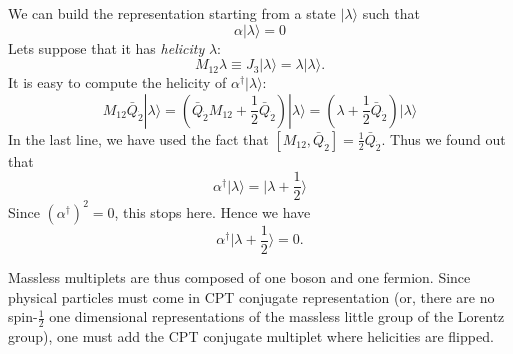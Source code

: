 We can build the representation starting from a state $|\lambda\rangle$ such
that
\begin{equation}
  \alpha|\lambda\rangle = 0
\end{equation}
Lets suppose that it has \textit{helicity} $\lambda$:
\begin{equation}
  M_{12}\lambda \equiv J_3|\lambda\rangle = \lambda|\lambda\rangle.
\end{equation}
It is easy to compute the helicity of $\alpha^{\dagger}|\lambda\rangle$:
\begin{equation}
  M_{12} \bar{Q}_{\dot{2}}|\lambda\rangle
  = \left(\bar{Q}_{\dot{2}}M_{12}+\frac{1}{2}\bar{Q}_{\dot{2}}\right)|\lambda\rangle
  = (\lambda+\frac{1}{2}\bar{Q}_{\dot{2}})|\lambda\rangle 
\end{equation}
In the last line, we have used the fact that
$\left[M_{12},\bar{Q}_{\dot{2}}\right]=\frac{1}{2}\bar{Q}_{\dot{2}}$. Thus we
found out that
\begin{equation}
  \alpha^\dagger|\lambda\rangle  = |\lambda+ \frac{1}{2}\rangle 
\end{equation}
Since $(\alpha^\dagger)^2 = 0$, this stops here. Hence we have
\begin{equation}
  \alpha^\dagger|\lambda+\frac{1}{2}\rangle = 0.
\end{equation}
\par
Massless multiplets are thus composed of one boson and one fermion. Since
physical particles must come in CPT conjugate representation (or, there are no
spin-$\frac{1}{2}$ one dimensional representations of the massless little group
of the Lorentz group), one must add the CPT conjugate multiplet where
helicities are flipped.
